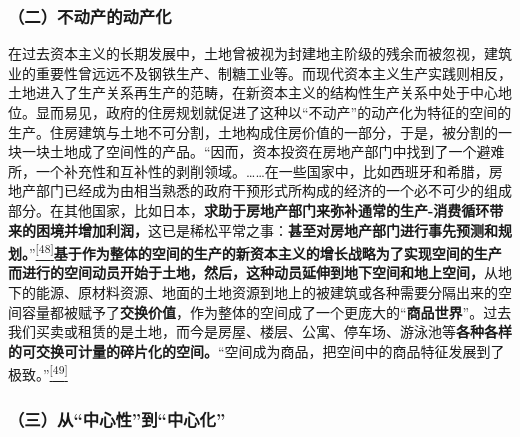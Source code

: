 \documentclass[UTF8, fontset = sourcesans, a4paper, oneside, zihao =
-4, scheme=chinese, no-math, space=true]{ctexbook}
\begin{document}
\subsubsection{（二）不动产的动产化}\label{part0007_split_003.htmlux5cux23d017}

在过去资本主义的长期发展中，土地曾被视为封建地主阶级的残余而被忽视，建筑业的重要性曾远远不及钢铁生产、制糖工业等。而现代资本主义生产实践则相反，土地进入了生产关系再生产的范畴，在新资本主义的结构性生产关系中处于中心地位。显而易见，政府的住房规划就促进了这种以``不动产''的动产化为特征的空间的生产。住房建筑与土地不可分割，土地构成住房价值的一部分，于是，被分割的一块一块土地成了空间性的产品。``因而，资本投资在房地产部门中找到了一个避难所，一个补充性和互补性的剥削领域。……在一些国家中，比如西班牙和希腊，房地产部门已经成为由相当熟悉的政府干预形式所构成的经济的一个必不可少的组成部分。在其他国家，比如日本，\textbf{求助于房地产部门来弥补通常的生产-消费循环带来的困境并增加利润，}这已是稀松平常之事：\textbf{甚至对房地产部门进行事先预测和规划。}''\protect\hypertarget{part0007_split_003.htmlux5cux23w48}{}{}\protect\hyperlink{part0007_split_004.htmlux5cux23m48}{\textsuperscript{{[}48{]}}}\textbf{基于作为整体的空间的生产的新资本主义的增长战略为了实现空间的生产而进行的空间动员开始于土地，然后，这种动员延伸到地下空间和地上空间，}从地下的能源、原材料资源、地面的土地资源到地上的被建筑或各种需要分隔出来的空间容量都被赋予了\textbf{交换价值}，作为整体的空间成了一个更庞大的``\textbf{商品世界}''。过去我们买卖或租赁的是土地，而今是房屋、楼层、公寓、停车场、游泳池等\textbf{各种各样的可交换可计量的碎片化的空间。}``空间成为商品，把空间中的商品特征发展到了极致。''\protect\hypertarget{part0007_split_003.htmlux5cux23w49}{}{}\protect\hyperlink{part0007_split_004.htmlux5cux23m49}{\textsuperscript{{[}49{]}}}

\subsubsection{\texorpdfstring{（三）从``中心性''到``中心化''}{（三）从中心性到中心化}}\label{part0007_split_003.htmlux5cux23d018}
\end{document}
